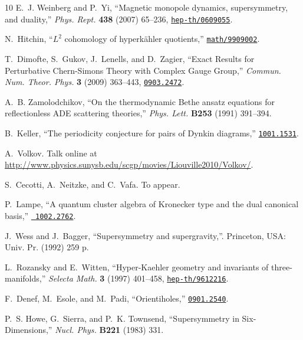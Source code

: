 \begin{thebibliography}{10}
E.~J. Weinberg and P.~Yi, ``{Magnetic monopole dynamics, supersymmetry, and
  duality},'' {\em Phys. Rept.} {\bf 438} (2007) 65--236,
\href{http://www.arXiv.org/abs/hep-th/0609055}{{\tt hep-th/0609055}}.

N.~Hitchin, ``{$L^2$} cohomology of hyperk\"ahler quotients,''
  \href{http://www.arXiv.org/abs/math/9909002}{{\tt math/9909002}}.

T.~Dimofte, S.~Gukov, J.~Lenells, and D.~Zagier, ``{Exact Results for
  Perturbative Chern-Simons Theory with Complex Gauge Group},'' {\em Commun.
  Num. Theor. Phys.} {\bf 3} (2009) 363--443,
\href{http://www.arXiv.org/abs/0903.2472}{{\tt 0903.2472}}.

A.~B. Zamolodchikov, ``{On the thermodynamic Bethe ansatz equations for
  reflectionless ADE scattering theories},'' {\em Phys. Lett.} {\bf B253}
  (1991)
391--394.

B.~Keller, ``{T}he periodicity conjecture for pairs of {D}ynkin diagrams,''
  \href{http://www.arXiv.org/abs/1001.1531}{{\tt 1001.1531}}.

A.~Volkov.
\newblock Talk online at
  \url{http://www.physics.sunysb.edu/scgp/movies/Liouville2010/Volkov/}.

S.~Cecotti, A.~Neitzke, and C.~Vafa.
\newblock To appear.

P.~Lampe, ``A quantum cluster algebra of {K}ronecker type and the dual
  canonical basis,'' \href{http://www.arXiv.org/abs/1002.2762}{{\tt
  1002.2762}}.

J.~Wess and J.~Bagger, ``{Supersymmetry and supergravity},''. Princeton, USA:
  Univ. Pr. (1992) 259 p.

L.~Rozansky and E.~Witten, ``{Hyper-Kaehler geometry and invariants of
  three-manifolds},'' {\em Selecta Math.} {\bf 3} (1997) 401--458,
\href{http://www.arXiv.org/abs/hep-th/9612216}{{\tt hep-th/9612216}}.

F.~Denef, M.~Esole, and M.~Padi, ``{Orientiholes},''
\href{http://www.arXiv.org/abs/0901.2540}{{\tt 0901.2540}}.

P.~S. Howe, G.~Sierra, and P.~K. Townsend, ``{Supersymmetry in
  Six-Dimensions},'' {\em Nucl. Phys.} {\bf B221} (1983)
331.

\end{thebibliography}
